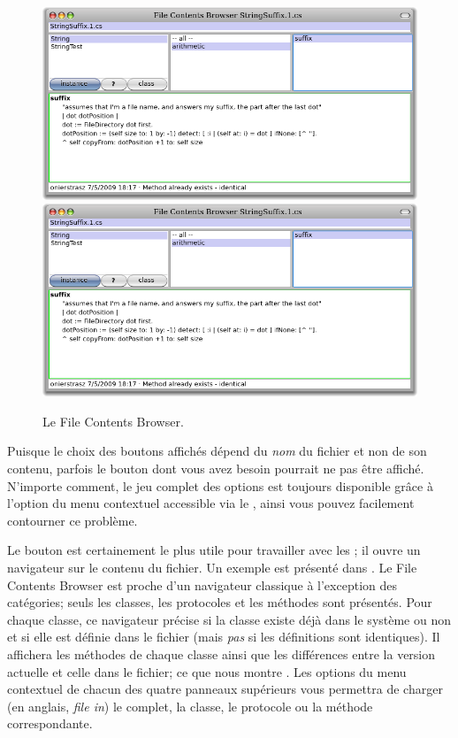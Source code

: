 \documentclass[a4paper,10pt,twoside]{book}
\begin{document}
\begin{figure}[btp]
	\begin{center}
	\ifluluelse
		{\includegraphics[width=\textwidth]{fileContentsBrowser}}
		{\includegraphics[scale=0.7]{fileContentsBrowser}}
	\end{center}
	\caption{Le File Contents Browser.}
	\label{fig:fileContentsBrowser}
\end{figure}

Puisque le choix des boutons affich\'es d\'epend du \emph{nom} du fichier et
non de son contenu, parfois le bouton dont vous avez besoin pourrait ne pas \^etre
affich\'e.
N'importe comment, le jeu complet des options est toujours disponible gr\^ace
\`a l'option  du menu contextuel accessible via le ,
ainsi vous pouvez facilement contourner ce probl\`eme.

Le bouton  est certainement le plus utile pour travailler avec les \changesets;
il ouvre un navigateur sur le contenu du fichier. Un exemple est pr\'esent\'e dans
.
Le File Contents Browser est proche d'un navigateur classique \`a l'exception
des cat\'egories; seuls les classes, les protocoles et les m\'ethodes sont pr\'esent\'es.
Pour chaque classe, ce navigateur pr\'ecise si la classe existe d\'ej\`a dans
le syst\`eme ou non et si elle est d\'efinie dans le fichier (mais \emph{pas} si
les d\'efinitions sont identiques).
Il affichera les m\'ethodes de chaque classe
ainsi que les diff\'erences entre la version actuelle et celle dans le fichier; ce que
nous montre .
Les options du menu contextuel de chacun des quatre panneaux sup\'erieurs vous
permettra de charger (en anglais, \emph{file in}) le \changeset complet, la classe, 
le protocole ou la m\'ethode correspondante.
\end{document}
